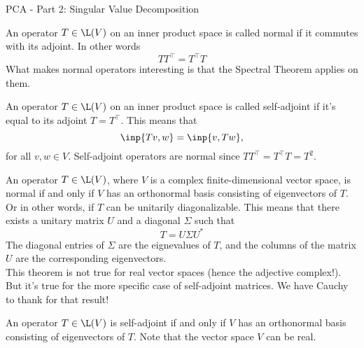 \begin{entry}[3]{PCA - Part 2: Singular Value Decomposition}

\begin{entrysection}
An operator $T \in \L(V)$ on an inner product space is called normal if it commutes with its adjoint. In other words
\[ T T^{\top} = T^{\top} T \]
What makes normal operators interesting is that the Spectral Theorem applies on them.
\end{entrysection}

\begin{entrysection}
An operator $T \in \L(V)$ on an inner product space is called self-adjoint if it's equal to its adjoint $T = T^{\top}$. This means that
\[ \inp{Tv, w} = \inp{v, Tw}, \]
for all $v, w \in V$.
Self-adjoint operators are normal since $TT^{\top} = T^{\top}T = T^2$.
\end{entrysection}

\begin{entrysection}
An operator $T \in \L(V)$, where $V$ is a complex finite-dimensional vector space, is normal if and only if $V$ has an orthonormal basis consisting of eigenvectors of $T$. Or in other words, if $T$ can be unitarily diagonalizable. This means that there exists a unitary matrix $U$ and a diagonal $\Sigma$ such that
\[ T = U\Sigma U^{*} \]
The diagonal entries of $\Sigma$ are the eignevalues of $T$, and the columns of the matrix $U$ are the corresponding eigenvectors.\\

\noindent This theorem is not true for real vector spaces (hence the adjective complex!). But it's true for the more specific case of self-adjoint matrices. We have Cauchy to thank for that result!
\end{entrysection}

\begin{entrysection}
An operator $T \in \L(V)$ is self-adjoint if and only if $V$ has an orthonormal basis consisting of eigenvectors of $T$. Note that the vector space $V$ can be real.
\end{entrysection}


\end{entry}
